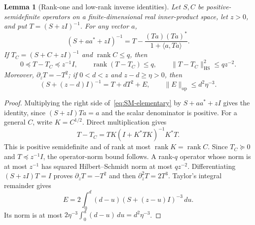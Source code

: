\documentclass[11pt]{article}
\newtheorem{lemma}[theorem]{Lemma}
\theoremstyle{definition}\newtheorem{definition}[theorem]{Definition}
\theoremstyle{remark}\newtheorem{remark}[theorem]{Remark}
\DeclareMathOperator{\rank}{rank}
\newcommand{\op}{\mathrm{op}}
\newcommand{\HS}{\mathrm{HS}}
\begin{document}
\begin{lemma}[Rank-one and low-rank inverse identities]\label{lem:inverse-facts}
Let $S,C$ be positive-semidefinite operators on a finite-dimensional real inner-product space, let $z>0$, and put $T=(S+zI)^{-1}$.
For any vector $a$,
\begin{equation}\label{eq:SM-elementary}
 (S+aa^*+zI)^{-1}
 =T-\frac{(Ta)(Ta)^*}{1+\langle a,Ta\rangle}.
\end{equation}
If $T_C=(S+C+zI)^{-1}$ and $\rank C\le q$, then
\begin{equation}\label{eq:low-rank-elementary}
 0\preceq T-T_C\preceq z^{-1}I,\qquad
 \rank(T-T_C)\le q,\qquad
 \|T-T_C\|_{\HS}^2\le qz^{-2}.
\end{equation}
Moreover, $\partial_z T=-T^2$; if $0<d<z$ and $z-d\ge\eta>0$, then
\begin{equation}\label{eq:shift-Taylor-elementary}
 (S+(z-d)I)^{-1}=T+dT^2+E,
 \qquad \|E\|_{\op}\le d^2\eta^{-3}.
\end{equation}
\end{lemma}
\begin{proof}
Multiplying the right side of~\eqref{eq:SM-elementary} by $S+aa^*+zI$ gives the identity, since $(S+zI)Ta=a$ and the scalar denominator is positive.
For a general $C$, write $K=C^{1/2}$. Direct multiplication gives
\[
 T-T_C=TK(I+K^*TK)^{-1}K^*T.
\]
This is positive semidefinite and of rank at most $\rank K=\rank C$. Since $T_C\succeq0$ and $T\preceq z^{-1}I$, the operator-norm bound follows. A rank-$q$ operator whose norm is at most $z^{-1}$ has squared Hilbert--Schmidt norm at most $qz^{-2}$.
Differentiating $(S+zI)T=I$ proves $\partial_zT=-T^2$ and then $\partial_z^2T=2T^3$. Taylor's integral remainder gives
\[
 E=2\int_0^d(d-u)(S+(z-u)I)^{-3}\,du.
\]
Its norm is at most $2\eta^{-3}\int_0^d(d-u)\,du=d^2\eta^{-3}$.
\end{proof}
\end{document}

